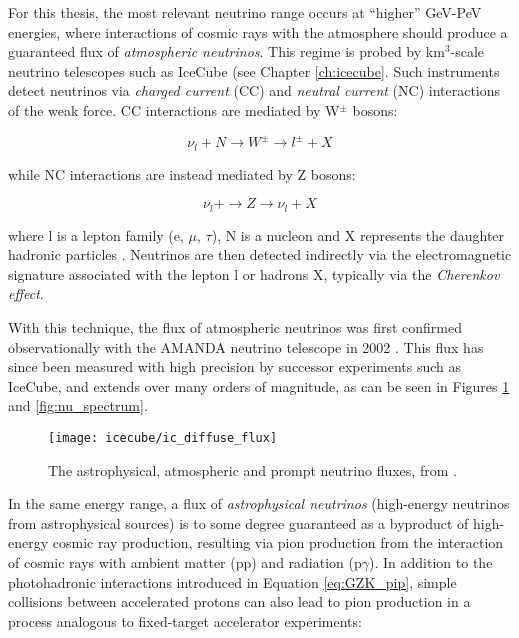 For this thesis, the most relevant neutrino range occurs at ``higher'' GeV-PeV energies, where interactions of cosmic rays with the atmosphere should produce a guaranteed flux of \emph{atmospheric neutrinos}. This regime is probed by km$^{3}$-scale neutrino telescopes such as IceCube (see Chapter \ref{ch:icecube}. Such instruments detect neutrinos via \emph{charged current} (CC) and \emph{neutral current} (NC) interactions of the weak force. CC interactions are mediated by W$^{\pm}$ bosons:

\begin{equation}
	\nu_{l} + N \rightarrow W^{\pm} \rightarrow l^{\pm} + X
\end{equation}

while NC interactions are instead mediated by Z bosons:

\begin{equation}
	\nu_{l} + \rightarrow Z \rightarrow \nu_{l} + X
\end{equation}

where l is a lepton family (e, $\mu$, $\tau$), N is a nucleon and X represents the daughter hadronic particles \cite{spurio_18}. Neutrinos are then detected indirectly via the electromagnetic signature associated with the lepton l or hadrons X, typically via the \emph{Cherenkov effect}. 

With this technique, the flux of atmospheric neutrinos was first confirmed observationally with the AMANDA neutrino telescope in 2002 . This flux has since been measured with high precision by successor experiments such as IceCube, and extends over many orders of magnitude, as can be seen in Figures \ref{fig:ic_diffuse_flux} and \ref{fig:nu_spectrum}. 

\begin{figure}
	\centering \texttt{[image: icecube/ic\_diffuse\_flux]}
	\caption{The astrophysical, atmospheric and prompt neutrino fluxes, from \cite{ic_15_joint}.}
	\label{fig:ic_diffuse_flux}
\end{figure}

In the same energy range, a flux of \emph{astrophysical neutrinos} (high-energy neutrinos from astrophysical sources) is to some degree guaranteed as a byproduct of high-energy cosmic ray production, resulting via pion production from the interaction of cosmic rays with ambient matter (pp) and radiation (p$\gamma$). In addition to the photohadronic interactions introduced in Equation \ref{eq:GZK_pip}, simple collisions between accelerated protons can also lead to pion production in a process analogous to fixed-target accelerator experiments:

